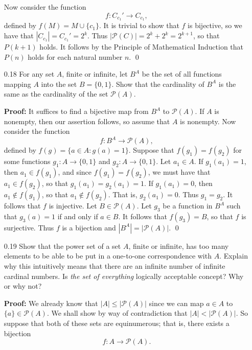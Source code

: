 \begin{enumerate}
      Now consider the function
      $$f : C_{c_1}' \rightarrow C_{c_1},$$
      defined by $f(M) = M \cup \{c_1\}$.
      It is trivial to show that $f$ is bijective, so we have that
      $|C_{c_1}| = C_{c_1}' = 2^k$. Thus
      $|\mathscr{P}(C)| = 2^k + 2^k = 2^{k + 1}$, so that $P(k + 1)$ holds. It 
      follows by the Principle of Mathematical Induction that $P(n)$ holds for 
      each natural number $n$. \qed
   \item[0.18] For any set $A$, finite or infinite, let $B^A$ be the set of all
               functions mapping $A$ into the set $B = \{0, 1\}$. Show that the
               cardinality of $B^A$ is the same as the cardinality of the set
               $\mathscr{P}(A)$.
               
      \textbf{Proof:} It suffices to find a bijective map from $B^A$ to
      $\mathscr{P}(A)$. If $A$ is nonempty, then our assertion follows, so
      assume that $A$ is nonempty. Now consider the function
      $$f : B^A \rightarrow \mathscr{P}(A),$$
      defined by $f(g) = \{a \in A : g(a) = 1\}$. Suppose that $f(g_1) = f(g_2)$
      for some functions $g_1 : A \rightarrow \{0, 1\}$ and
      $g_2 : A \rightarrow \{0, 1\}$. Let $a_1 \in A$. If $g_1(a_1) = 1$, then
      $a_1 \in f(g_1)$, and since $f(g_1) = f(g_2)$, we must have that
      $a_1 \in f(g_2)$, so that $g_1(a_1) = g_2(a_1) = 1$. If $g_1(a_1) = 0$,
      then $a_1 \notin f(g_1)$, so that $a_1 \notin f(g_2)$. That is,
      $g_2(a_1) = 0$. Thus $g_1 = g_2$. It follows that $f$ is injective.      
      Let $B \in \mathscr{P}(A)$. Let $g_3$ be a function in $B^A$ such that
      $g_3(a) = 1$ if and only if $a \in B$. It follows that $f(g_3) = B$, so
      that $f$ is surjective. Thus $f$ is a bijection and
      $|B^A| = |\mathscr{P}(A)|$. \qed
   \item[0.19] Show that the power set of a set $A$, finite or infinite, has
               too many elements to be able to be put in a one-to-one
               correspondence with $A$. Explain why this intuitively means that
               there are an infinite number of infinite cardinal numbers. Is
               \textit{the set of everything} logically acceptable concept? Why
               or why not?
               
      \textbf{Proof:} We already know that $|A| \le |\mathscr{P}(A)|$ since we
      can map $a \in A$ to $\{a\} \in \mathscr{P}(A)$. We shall show by way of
      contradiction that $|A| < |\mathscr{P}(A)|$. So suppose that both of these
      sets are equinumerous; that is, there exists a bijection
      $$f : A \rightarrow \mathscr{P}(A).$$
      

\end{enumerate}
